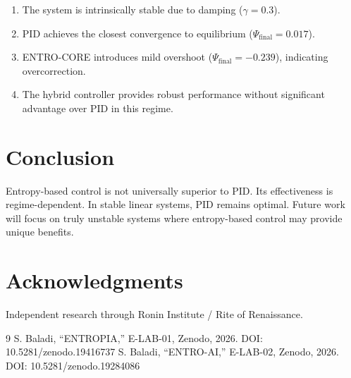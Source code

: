 \documentclass[twocolumn]{article}
\begin{document}
\begin{enumerate}
\item The system is intrinsically stable due to damping ($\gamma=0.3$).
\item PID achieves the closest convergence to equilibrium ($\Psi_{\text{final}} = 0.017$).
\item ENTRO-CORE introduces mild overshoot ($\Psi_{\text{final}} = -0.239$), indicating overcorrection.
\item The hybrid controller provides robust performance without significant advantage over PID in this regime.
\end{enumerate}

\section{Conclusion}

Entropy-based control is not universally superior to PID. Its effectiveness is regime-dependent. In stable linear systems, PID remains optimal. Future work will focus on truly unstable systems where entropy-based control may provide unique benefits.

\section*{Acknowledgments}

Independent research through Ronin Institute / Rite of Renaissance.

\begin{thebibliography}{9}
 S. Baladi, ``ENTROPIA,'' E-LAB-01, Zenodo, 2026. DOI: 10.5281/zenodo.19416737
 S. Baladi, ``ENTRO-AI,'' E-LAB-02, Zenodo, 2026. DOI: 10.5281/zenodo.19284086
\end{thebibliography}
\end{document}
